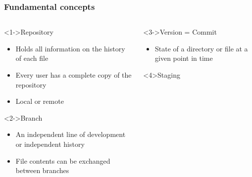 \documentclass{beamer}
\begin{document}
\begin{frame}[t]
    \frametitle{Fundamental concepts}
    \vspace{-7.5mm}
    \begin{columns}[T]
        \begin{column}{.39\linewidth}
            \begin{block}<1->{Repository}
                \begin{itemize}
                    \item Holds all information on the history of each file
                    \item Every user has a complete copy of the repository
                    \item Local or remote
                \end{itemize}
            \end{block}
            \vspace{-2mm}
            \begin{block}<2->{Branch}
                \begin{itemize}
                    \item An independent line of development or independent
                        history
                    \item File contents can be exchanged between branches
                \end{itemize}
            \end{block}
        \end{column}
        \begin{column}{.58\linewidth}
            \begin{block}<3->{Version = Commit}
                \begin{itemize}
                    \item State of a directory or file at a given point in time
                \end{itemize}
            \end{block}
            \vspace{-2mm}
            \begin{block}<4>{Staging}
\end{block}
\end{column}
\end{columns}
\end{frame}
\end{document}
